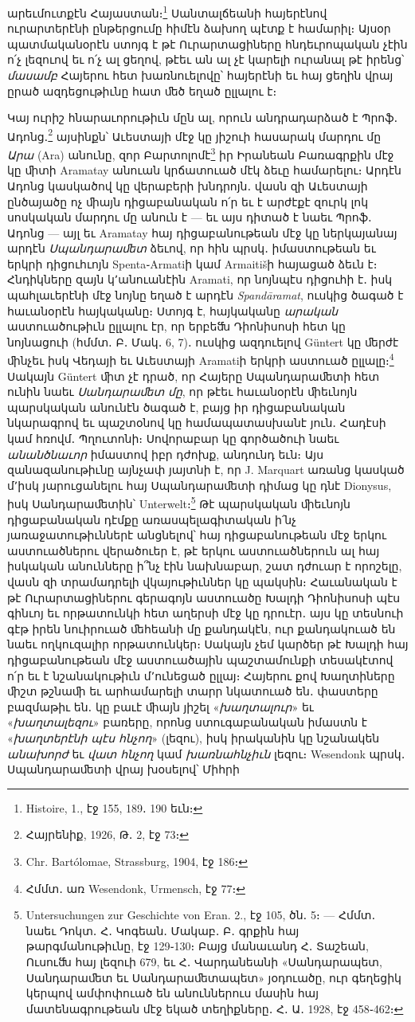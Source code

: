 \documentclass{article}
\begin{document}
{արեւմուտքէն Հայաստան։\footnote{Histoire, 1., էջ 155, 189․ 190 եւն։} Սանտալճեանի հայերէնով ուրարտերէնի ընթերցումը հիմէն ձախող պէտք է համարիլ։ Այսօր պատմականօրէն ստոյգ է թէ Ուրարտացիները հնդեւրոպական չէին ո՛չ լեզուով եւ ո՛չ ալ ցեղով, թէեւ ան ալ չէ կարելի ուրանալ թէ իրենց՝ \emph{մասամբ} Հայերու հետ խառնուելովը՝ հայերէնի եւ հայ ցեղին վրայ ըրած ազդեցութիւնը հատ ﬔծ եղած ըլլալու է։

Կայ ուրիշ հնարաւորութիւն մըն ալ, որուն անդրադարձած է Պրոֆ․ Ադոնց․\footnote{Հայրենիք, 1926, Թ․ 2, էջ 73։} այսինքն՝ Աւեստայի մէջ կը յիշուի հասարակ մարդու մը \emph{Արա} (Ara) անունը, զոր Բարտոլոմէ\footnote{Chr. Bartólomae, Strassburg, 1904, էջ 186։} իր Իրանեան Բառագրքին մէջ կը ﬕտի Aramatay անուան կրճատուած մէկ ձեւը համարելու։ Արդէն Ադոնց կասկածով կը վերաբերի խնդրոյն․ վասն զի Աւեստայի ընծայածը ոչ ﬕայն դիցաբանական ո՛ր եւ է արժէքէ զուրկ լոկ սոսկական մարդու մը անուն է — եւ այս դիտած է նաեւ Պրոֆ․ Ադոնց — այլ եւ Aramatay հայ դիցաբանութեան մէջ կը ներկայանայ արդէն \emph{Սպանդարաﬔտ} ձեւով, որ հին պրսկ․ իմաստութեան եւ երկրի դիցուհւոյն Spenta֊Armatiի կամ Armaitišի հայացած ձեւն է։ Հնդիկները զայն կ՚անուանէին Aramati, որ նոյնպէս դիցուհի է․ իսկ պահլաւերէնի մէջ նոյնը եղած է արդէն \emph{Spandāramat}, ուսկից ծագած է հաւանօրէն հայկականը։ Ստոյգ է, հայկականը \emph{արական} աստուածութիւն ըլլալու էր, որ երբեﬓ Դիոնիսոսի հետ կը նոյնացուի (հմմտ․ Բ․ Մակ․ 6, 7)․ ուսկից ազդուելով Güntert կը ﬔրժէ ﬕնչեւ իսկ Վեդայի եւ Աւեստայի Aramatiի երկրի աստուած ըլլալը։\footnote{Հմմտ․ առ Wesendonk, Urmensch, էջ 77։} Սակայն Güntert ﬕտ չէ դրած, որ Հայերը Սպանդարաﬔտի հետ ունին նաեւ \emph{Սանդարաﬔտ մը}, որ թէեւ հաւանօրէն ﬕեւնոյն պարսկական անունէն ծագած է, բայց իր դիցաբանական նկարագրով եւ պաշտօնով կը համապատասխանէ յուն․ Հադէսի կամ հռովմ․ Պղուտոնի։ Սովորաբար կը գործածուի նաեւ \emph{անանծնաւոր} իմաստով իբր դժոխք, անդունդ եւն։ Այս զանազանութիւնը այնչափ յայտնի է, որ J. Marquart առանց կասկած մ՚իսկ յարուցանելու հայ Սպանդարաﬔտի դիմաց կը դնէ Dionysus, իսկ Սանդարաﬔտին՝ Unterwelt։\footnote{Untersuchungen zur Geschichte von Eran. 2., էջ 105, ծն․ 5։ — Հմմտ․ նաեւ Դոկտ․ Հ․ Կոգեան․ Մակաբ․ Բ․ գրքին հայ թարգմանութիւնը, էջ 129֊130։ Բայց մանաւանդ Հ․ Տաշեան, Ուսուﬓ հայ լեզուի 679, եւ Հ․ Վարդանեանի «Սանդարապետ, Սանդարաﬔտ եւ Սանդարաﬔտապետ» յօդուածը, ուր գեղեցիկ կերպով ամփոփուած են անուններուս մասին հայ մատենագրութեան մէջ եկած տեղիքները․ Հ․ Ա․ 1928, էջ 458֊462։} Թէ պարսկական ﬕեւնոյն դիցաբանական դէմքը առասպելագիտական ի՛նչ յառաջատութիւններէ անցնելով՝ հայ դիցաբանութեան մէջ երկու աստուածներու վերածուեր է, թէ երկու աստուածներուն ալ հայ իսկական անունները ի՞նչ էին նախնաբար, շատ դժուար է որոշելը, վասն զի տրամադրելի վկայութիւններ կը պակսին։ Հաւանական է թէ Ուրարտացիներու գերագոյն աստուածը Խալդի Դիոնիսոսի պէս գինւոյ եւ որթատունկի հետ աղերսի մէջ կը դրուէր․ այս կը տեսնուի գէթ իրեն նուիրուած ﬔհեանի մը քանդակէն, ուր քանդակուած են նաեւ ողկուզալիր որթատունկեր։ Սակայն չեմ կարծեր թէ Խալդի հայ դիցաբանութեան մէջ աստուածային պաշտամունքի տեսակէտով ո՛ր եւ է նշանակութիւն մ՚ունեցած ըլլայ։ Հայերու քով Խաղտիները ﬕշտ թշնաﬕ եւ արհամարելի տարր նկատուած են․ փաստերը բազմաթիւ են․ կը բաւէ ﬕայն յիշել «\emph{խաղտալուր}» եւ «\emph{խաղտալեզու}» բառերը, որոնց ստուգաբանական իմաստն է «\emph{խաղտերէնի պէս հնչող}» (լեզու), իսկ իրականին կը նշանակեն \emph{անախորժ} եւ \emph{վատ հնչող} կամ \emph{խառնահնչիւն} լեզու։ Wesendonk պրսկ․ Սպանդարաﬔտի վրայ խօսելով՝ Միհրի }
\end{document}
